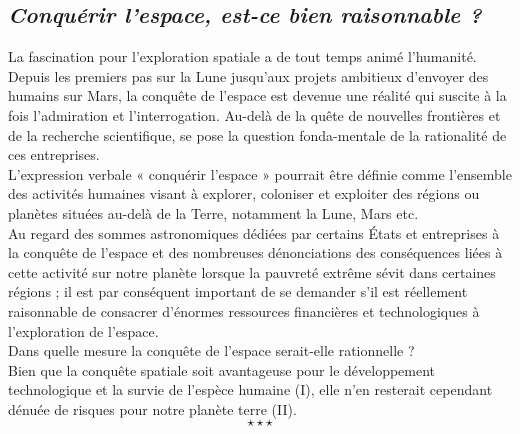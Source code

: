 \begin{center}
	\subsection*{\textit{Conquérir l'espace, est-ce bien raisonnable ?}}
\end{center}
\hspace*{0.5cm}La fascination pour l’exploration spatiale a de tout temps animé l’humanité. Depuis les premiers pas sur la Lune jusqu'aux projets ambitieux d'envoyer des humains sur Mars, la conquête de l'espace est devenue une réalité qui suscite à la fois l'admiration et l'interrogation. Au-delà de la quête de nouvelles frontières et de la recherche scientifique, se pose la question fonda-mentale de la rationalité de ces entreprises. \\
\hspace*{0.5cm}L’expression verbale « conquérir l'espace » pourrait être définie comme l'ensemble des activités humaines visant à explorer, coloniser et exploiter des régions ou planètes situées au-delà de la Terre, notamment la Lune, Mars etc.\\
\hspace*{0.5cm}Au regard des sommes astronomiques dédiées par certains États et entreprises à la conquête de l’espace et des nombreuses dénonciations des conséquences liées à cette activité sur notre planète lorsque la pauvreté extrême sévit dans certaines régions ; il est par conséquent important de se demander s’il est réellement raisonnable de consacrer d'énormes ressources financières et technologiques à l'exploration de l'espace.\\
\hspace*{0.5cm}Dans quelle mesure la conquête de l’espace serait-elle rationnelle ?\\
\hspace*{0.5cm}Bien que la conquête spatiale soit avantageuse pour le développement technologique et la survie de l’espèce humaine (I), elle n’en resterait cependant dénuée de risques pour notre planète terre (II).
$$\star \star \star$$
